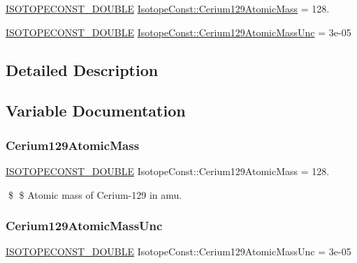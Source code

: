 \begin{DoxyCompactItemize}
\item 
\mbox{\hyperlink{group___isotope_const-_macros_ga8f45a7272ce02c0b4c65c44636ed719a}{I\+S\+O\+T\+O\+P\+E\+C\+O\+N\+S\+T\+\_\+\+D\+O\+U\+B\+LE}} \mbox{\hyperlink{group___isotope_const-_cerium-_ce129_gaf760a1662052704a217e40e7290c6e3b}{Isotope\+Const\+::\+Cerium129\+Atomic\+Mass}} = 128.
\item 
\mbox{\hyperlink{group___isotope_const-_macros_ga8f45a7272ce02c0b4c65c44636ed719a}{I\+S\+O\+T\+O\+P\+E\+C\+O\+N\+S\+T\+\_\+\+D\+O\+U\+B\+LE}} \mbox{\hyperlink{group___isotope_const-_cerium-_ce129_gac8bed9cdb8e2ac2c0dbd552352722dcd}{Isotope\+Const\+::\+Cerium129\+Atomic\+Mass\+Unc}} = 3e-\/05
\end{DoxyCompactItemize}


\subsection{Detailed Description}


\subsection{Variable Documentation}
\mbox{\label{group___isotope_const-_cerium-_ce129_gaf760a1662052704a217e40e7290c6e3b}} 
\subsubsection{\texorpdfstring{Cerium129\+Atomic\+Mass}{Cerium129AtomicMass}}
{\footnotesize\ttfamily \mbox{\hyperlink{group___isotope_const-_macros_ga8f45a7272ce02c0b4c65c44636ed719a}{I\+S\+O\+T\+O\+P\+E\+C\+O\+N\+S\+T\+\_\+\+D\+O\+U\+B\+LE}} Isotope\+Const\+::\+Cerium129\+Atomic\+Mass = 128.}

\$ \$ Atomic mass of Cerium-\/129 in amu. \mbox{\label{group___isotope_const-_cerium-_ce129_gac8bed9cdb8e2ac2c0dbd552352722dcd}} 
\subsubsection{\texorpdfstring{Cerium129\+Atomic\+Mass\+Unc}{Cerium129AtomicMassUnc}}
{\footnotesize\ttfamily \mbox{\hyperlink{group___isotope_const-_macros_ga8f45a7272ce02c0b4c65c44636ed719a}{I\+S\+O\+T\+O\+P\+E\+C\+O\+N\+S\+T\+\_\+\+D\+O\+U\+B\+LE}} Isotope\+Const\+::\+Cerium129\+Atomic\+Mass\+Unc = 3e-\/05}

